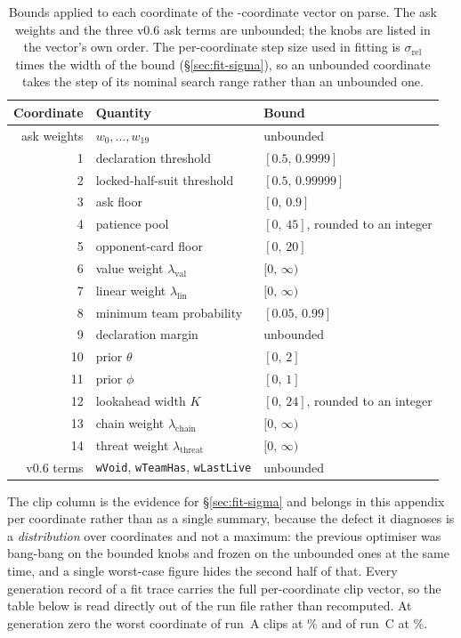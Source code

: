 \begin{table}[ht]
\centering
\caption{Bounds applied to each coordinate of the \numVsixParams{}-coordinate
vector on parse. The ask weights and the three v0.6 ask terms are unbounded; the
\numVfiveKnobs{} knobs are listed in the vector's own order. The per-coordinate
step size used in fitting is $\sigma_{\mathrm{rel}}$ times the width of the bound
(\S\ref{sec:fit-sigma}), so an unbounded coordinate takes the step of its
nominal search range rather than an unbounded one.}
\label{tab:bounds}
\small
\begin{tabular}{rll}
\toprule
Coordinate & Quantity & Bound \\
\midrule
ask weights & $w_0,\dots,w_{19}$ & unbounded \\
\midrule
1 & declaration threshold & $[0.5,\,0.9999]$ \\
2 & locked-half-suit threshold & $[0.5,\,0.99999]$ \\
3 & ask floor & $[0,\,0.9]$ \\
4 & patience pool & $[0,\,45]$, rounded to an integer \\
5 & opponent-card floor & $[0,\,20]$ \\
6 & value weight $\lambda_{\mathrm{val}}$ & $[0,\,\infty)$ \\
7 & linear weight $\lambda_{\mathrm{lin}}$ & $[0,\,\infty)$ \\
8 & minimum team probability & $[0.05,\,0.99]$ \\
9 & declaration margin & unbounded \\
10 & prior $\theta$ & $[0,\,2]$ \\
11 & prior $\phi$ & $[0,\,1]$ \\
12 & lookahead width $K$ & $[0,\,24]$, rounded to an integer \\
13 & chain weight $\lambda_{\mathrm{chain}}$ & $[0,\,\infty)$ \\
14 & threat weight $\lambda_{\mathrm{threat}}$ & $[0,\,\infty)$ \\
\midrule
v0.6 terms & \texttt{wVoid}, \texttt{wTeamHas}, \texttt{wLastLive} & unbounded \\
\bottomrule
\end{tabular}
\end{table}

The clip column is the evidence for \S\ref{sec:fit-sigma} and belongs in this
appendix per coordinate rather than as a single summary, because the defect it
diagnoses is a \emph{distribution} over coordinates and not a maximum: the
previous optimiser was bang-bang on the bounded knobs and frozen on the unbounded
ones at the same time, and a single worst-case figure hides the second half of
that. Every generation record of a fit trace carries the full per-coordinate clip
vector, so the table below is read directly out of the run file rather than
recomputed. At generation zero the worst coordinate of run~A clips at
\vsixFitAClipGenZero{}\% and of run~C at \vsixFitCClipGenZero{}\%.


